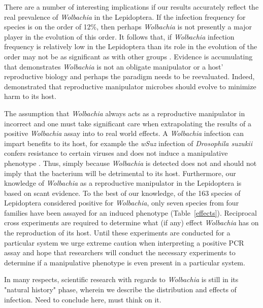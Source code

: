 \documentclass{frontiersSCNS} %
\begin{document}
There are a number of interesting implications if our results accurately reflect the real prevalence of \emph{Wolbachia} in the Lepidoptera. If the infection frequency for species is on the order of 12\%, then perhaps \emph{Wolbachia} is not presently a major player in the evolution of this order.  It follows that, if \emph{Wolbachia} infection frequency is relatively low in the Lepidoptera than its role in the evolution of the order may not be as significant as with other groups \citep{Miller:2010ki}. Evidence is accumulating that demonstrates \emph{Wolbachia} is not an obligate manipulator or a host' reproductive biology \citep{Hamm:2014cv,Zhang:2010jl,Zhang:2013eo} and perhaps the paradigm needs to be reevaluated. Indeed, \citet{Prout:1994th} demonstrated that reproductive manipulator microbes should evolve to minimize harm to its host. 

The assumption that \emph{Wolbachia} always acts as a reproductive manipulator in incorrect \citep{Nice:2009p7399,Hamm:2014wi} and one must take significant care when extrapolating the results of a positive \emph{Wolbachia} assay into to real world effects. A \emph{Wolbachia} infection can impart benefits to its host, for example the \emph{wSuz} infection of \emph{Drosophila suzukii} confers resistance to certain viruses \citep{Cattel:IMB12245} and does not induce a manipulative phenotype \citep{Hamm:2014cv}. Thus, simply because \emph{Wolbachia} is detected does not and should not imply that the bacterium will be detrimental to its host. Furthermore, our knowledge of \emph{Wolbachia} as a reproductive manipulator in the Lepidoptera is based on scant evidence. To the best of our knowledge, of the 163 species of Lepidoptera considered positive for \emph{Wolbachia}, only seven species from four families have been assayed for an induced phenotype (Table~\ref{effects}). Reciprocal cross experiments are required to determine what (if any) effect \emph{Wolbachia} has on the reproduction of its host. Until these experiments are conducted for a particular system we urge extreme caution when interpreting a positive PCR assay and hope that researchers will conduct the necessary experiments to determine if a manipulative phenotype is even present in a particular system. 


In many respects, scientific research with regards to \textit{Wolbachia} is still in its "natural history" phase, wherein we describe the distribution and effects of infection.  
Need to conclude here, must think on it. 
\end{document}
